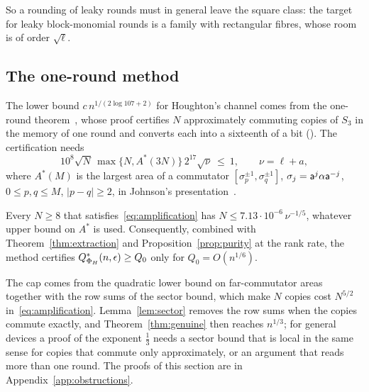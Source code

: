 So a rounding of leaky rounds must in general leave the square class: the target for leaky block-monomial rounds is a family with rectangular
fibres, whose room is of order $\sqrt\ell$.

\subsection{The one-round method}

The lower bound $c\,n^{1/(2\log107+2)}$ for Houghton's channel comes from the one-round theorem~\cite[Theorem~5.5]{DouglasMghirbiB}, whose proof certifies $N$
approximately commuting copies of $S_3$ in the memory of one round and converts each into a sixteenth of a bit
(\cite[Appendix~B, proof of Theorem~5.5]{DouglasMghirbiB}). The certification needs
\begin{equation}\label{eq:amplification}
10^8\sqrt N\,\max\{N,A^*(3N)\}\,2^{17}\sqrt\nu\ \le\ 1,\qquad \nu=\ell+a,
\end{equation}
where $A^*(M)$ is the largest area of a commutator $[\sigma_p^{\pm1},\sigma_q^{\pm1}]$, $\sigma_j=\mathsf a^j\alpha\mathsf a^{-j}$, $0\le p,q\le M$, $|p-q|\ge2$, in
Johnson's presentation~\cite[Section~4.1]{DouglasMghirbiB}.

\begin{proposition}\label{prop:sixth}
Every $N\ge8$ that satisfies~\eqref{eq:amplification} has $N\le7.13\cdot10^{-6}\,\nu^{-1/5}$, whatever upper bound on $A^*$ is used. Consequently, combined
with Theorem~\ref{thm:extraction} and Proposition~\ref{prop:purity} at the rank rate, the method certifies $Q^{*}_{\Phi_H}(n,\epsilon)\ge Q_0$ only for
$Q_0=O(n^{1/6})$.
\end{proposition}

The cap comes from the quadratic lower bound on far-commutator areas~\cite[Proposition~4.4]{DouglasMghirbiB} together with the row sums of the
sector bound, which make $N$ copies cost $N^{5/2}$ in~\eqref{eq:amplification}. Lemma~\ref{lem:sector} removes the row sums when the copies
commute exactly, and Theorem~\ref{thm:genuine} then reaches $n^{1/3}$; for general devices a proof of the exponent $\frac13$ needs a sector bound that
is local in the same sense for copies that commute only approximately, or an argument that reads more than one round. The proofs of this section are
in Appendix~\ref{app:obstructions}.
